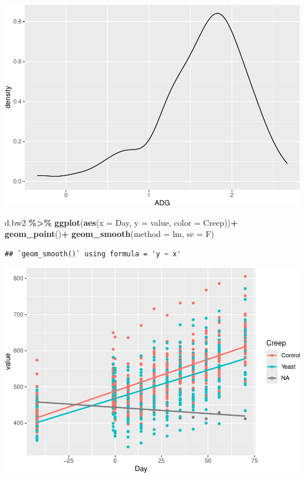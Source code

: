 \documentclass[
]{book}
\newenvironment{Shaded}{\begin{snugshade}}{\end{snugshade}}
\newcommand{\AttributeTok}[1]{\textcolor[rgb]{0.13,0.29,0.53}{#1}}
\newcommand{\FunctionTok}[1]{\textcolor[rgb]{0.13,0.29,0.53}{\textbf{#1}}}
\newcommand{\NormalTok}[1]{#1}
\newcommand{\SpecialCharTok}[1]{\textcolor[rgb]{0.81,0.36,0.00}{\textbf{#1}}}
\newcommand{\StringTok}[1]{\textcolor[rgb]{0.31,0.60,0.02}{#1}}
\begin{document}
\includegraphics{bookdown-demo_files/figure-latex/unnamed-chunk-7-2.pdf}

\begin{Shaded}
\begin{Highlighting}[]
\NormalTok{d.bw2 }\SpecialCharTok{\%\textgreater{}\%} 
  \FunctionTok{ggplot}\NormalTok{(}\FunctionTok{aes}\NormalTok{(}\AttributeTok{x =}\NormalTok{ Day, }\AttributeTok{y =}\NormalTok{ value, }\AttributeTok{color =}\NormalTok{ Creep))}\SpecialCharTok{+}
  \FunctionTok{geom\_point}\NormalTok{()}\SpecialCharTok{+}
  \FunctionTok{geom\_smooth}\NormalTok{(}\AttributeTok{method =} \StringTok{\textquotesingle{}lm\textquotesingle{}}\NormalTok{, }\AttributeTok{se =}\NormalTok{ F)}
\end{Highlighting}
\end{Shaded}

\begin{verbatim}
## `geom_smooth()` using formula = 'y ~ x'
\end{verbatim}

\includegraphics{bookdown-demo_files/figure-latex/unnamed-chunk-7-3.pdf}
\end{document}
